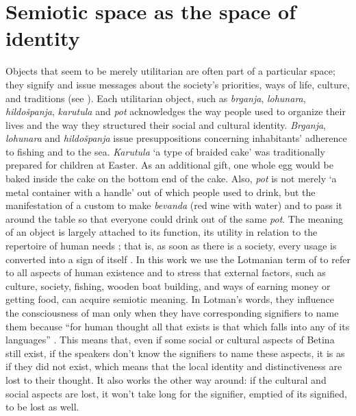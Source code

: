 \documentclass[output=paper]{LSP/langsci}
\begin{document}
\section{Semiotic space as the space of identity}
Objects that seem to be merely utilitarian are often part of a particular space; they signify and issue messages about the society’s priorities, ways of life, culture, and traditions (see \citealt[110]{hawkes_structuralism_2004}). Each utilitarian object, such as \textit{brganja}, \textit{lohunara}, \textit{hildošpanja}, \textit{karutula} and \textit{pot} acknowledges the way people used to organize their lives and the way they structured their social and cultural identity. \textit{Brganja}, \textit{lohunara} and \textit{hildošpanja} issue presuppositions concerning inhabitants’ adherence to fishing and to the sea. \textit{Karutula} ‘a type of braided cake’ was traditionally prepared for children at Easter. As an additional gift, one whole egg would be baked inside the cake on the bottom end of the cake. Also, \textit{pot} is not merely ‘a metal container with a handle’ out of which people used to drink, but the manifestation of a custom to make \textit{bevanda} (red wine with water) and to pass it around the table so that everyone could drink out of the same \textit{pot}. The meaning of an object is largely attached to its function, its utility in relation to the repertoire of human needs \citep[48]{moles_theorie_1972}; that is, as soon as there is a society, every usage is converted into a sign of itself \citep[41]{barthes_elements_1968}. In this work we use the Lotmanian term of  to refer to all aspects of human existence and to stress that external factors, such as culture, society, fishing, wooden boat building, and ways of earning money or getting food, can acquire semiotic meaning. In Lotman’s words, they influence the consciousness of man only when they have corresponding signifiers to name them because “for human thought all that exists is that which falls into any of its languages” \citep[134]{lotman_culture_2009}. This means that, even if some social or cultural aspects of Betina still exist, if the speakers don’t know the signifiers to name these aspects, it is as if they did not exist, which means that the local identity and distinctiveness are lost to their thought. It also works the other way around: if the cultural and social aspects are lost, it won’t take long for the signifier, emptied of its signified, to be lost as well.
\end{document}
